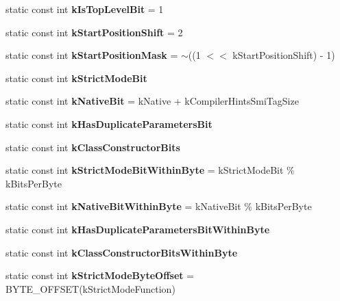 \begin{DoxyCompactItemize}
\item 
static const int {\bfseries k\+Is\+Top\+Level\+Bit} = 1\hypertarget{classv8_1_1internal_1_1_shared_function_info_adc95d1c6bf25ede4b1a93ce81b8e4178}{}\label{classv8_1_1internal_1_1_shared_function_info_adc95d1c6bf25ede4b1a93ce81b8e4178}

\item 
static const int {\bfseries k\+Start\+Position\+Shift} = 2\hypertarget{classv8_1_1internal_1_1_shared_function_info_a1bbfd2d3800f2f9d0e163ec6853a5ddc}{}\label{classv8_1_1internal_1_1_shared_function_info_a1bbfd2d3800f2f9d0e163ec6853a5ddc}

\item 
static const int {\bfseries k\+Start\+Position\+Mask} = $\sim$((1 $<$$<$ k\+Start\+Position\+Shift) -\/ 1)\hypertarget{classv8_1_1internal_1_1_shared_function_info_a842d691f3494ecaa2240bfb45b1f7260}{}\label{classv8_1_1internal_1_1_shared_function_info_a842d691f3494ecaa2240bfb45b1f7260}

\item 
static const int {\bfseries k\+Strict\+Mode\+Bit}
\item 
static const int {\bfseries k\+Native\+Bit} = k\+Native + k\+Compiler\+Hints\+Smi\+Tag\+Size\hypertarget{classv8_1_1internal_1_1_shared_function_info_a1f08c48ec6818301a04e7d6ecfcab9c3}{}\label{classv8_1_1internal_1_1_shared_function_info_a1f08c48ec6818301a04e7d6ecfcab9c3}

\item 
static const int {\bfseries k\+Has\+Duplicate\+Parameters\+Bit}
\item 
static const int {\bfseries k\+Class\+Constructor\+Bits}
\item 
static const int {\bfseries k\+Strict\+Mode\+Bit\+Within\+Byte} = k\+Strict\+Mode\+Bit \% k\+Bits\+Per\+Byte\hypertarget{classv8_1_1internal_1_1_shared_function_info_a8c71a51bde843b01efc2c2320ef0ab4e}{}\label{classv8_1_1internal_1_1_shared_function_info_a8c71a51bde843b01efc2c2320ef0ab4e}

\item 
static const int {\bfseries k\+Native\+Bit\+Within\+Byte} = k\+Native\+Bit \% k\+Bits\+Per\+Byte\hypertarget{classv8_1_1internal_1_1_shared_function_info_a8839dd80057205c96bfaa74767ed4c3a}{}\label{classv8_1_1internal_1_1_shared_function_info_a8839dd80057205c96bfaa74767ed4c3a}

\item 
static const int {\bfseries k\+Has\+Duplicate\+Parameters\+Bit\+Within\+Byte}
\item 
static const int {\bfseries k\+Class\+Constructor\+Bits\+Within\+Byte}
\item 
static const int {\bfseries k\+Strict\+Mode\+Byte\+Offset} = B\+Y\+T\+E\+\_\+\+O\+F\+F\+S\+ET(k\+Strict\+Mode\+Function)\hypertarget{classv8_1_1internal_1_1_shared_function_info_a7383aabb3efea58aa8e4861850dc8ea8}{}\label{classv8_1_1internal_1_1_shared_function_info_a7383aabb3efea58aa8e4861850dc8ea8}


\end{DoxyCompactItemize}
